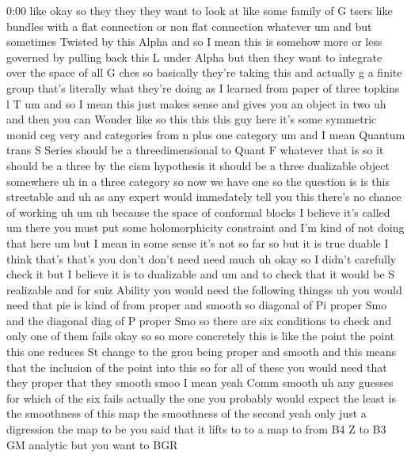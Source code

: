 \begin{unfinished}{0:00}
like  okay  so  they
they  they  want  to  look  at  like  some
family  of  G  tsers  like  bundles  with  a
flat  connection  or  non  flat  connection
whatever  um  and  but  sometimes  Twisted  by
this  Alpha  and  so  I  mean  this  is  somehow
more  or  less  governed  by  pulling  back
this  L  under
Alpha  but  then  they  want  to  integrate
over  the  space  of  all  G  ches  so
basically  they're  taking
this  and  actually  g  a  finite  group
that's  literally  what  they're  doing  as  I
learned  from  paper  of  three  topkins  l
T  um  and  so  I  mean  this  just  makes  sense
and  gives  you  an  object  in
two
uh  and  then  you  can
Wonder  like  so  this  this  this  guy  here
it's  some  symmetric
monid
ceg  very  and  categories  from  n  plus  one
category
um  and  I  mean  Quantum  trans  S  Series
should  be  a  threedimensional  to  Quant  F
whatever  that  is  so  it  should  be  a  three
by  the  cism  hypothesis  it  should  be  a
three  dualizable  object
somewhere  uh  in  a  three  category  so  now
we  have  one  so  the  question  is  is  this
streetable  and  uh  as  any  expert  would
immedately  tell  you  this  there's  no
chance  of  working
uh
um  uh
because  the  space  of  conformal  blocks  I
believe  it's  called  um  there  you  must
put  some  holomorphicity  constraint  and
I'm  kind  of  not  doing  that  here
um  but  I  mean  in  some  sense  it's  not  so
far  so
but  it  is  true
duable  I  think  that's
that's  you  don't  don't  need  need  much  uh
okay  so  I  didn't  carefully  check  it  but
I  believe  it  is  to  dualizable  and  um  and
to  check  that  it  would  be  S  realizable
and  for  suiz  Ability  you  would  need  the
following
thingss
uh  you  would  need
that  pie  is  kind  of
from  proper  and
smooth  so  diagonal  of
Pi  proper  Smo  and  the  diagonal  diag  of  P
proper  Smo  so  there  are  six  conditions
to  check  and  only  one  of  them  fails  okay
so  so  more  concretely  this  is  like  the
point  the
point  this  one
reduces  St  change  to  the  grou  being
proper  and  smooth  and  this  means  that
the  inclusion  of  the  point  into
this  so  for  all  of  these  you  would  need
that  they  proper  that  they  smooth  smoo  I
mean  yeah  Comm  smooth  uh  any  guesses  for
which  of  the  six
fails  actually  the  one  you  probably
would  expect  the  least  is  the  smoothness
of  this
map  the  smoothness  of  the  second  yeah
only
just  a  digression  the  map  to  be  you  said
that  it  lifts  to  to  a  map  to  from  B4  Z
to  B3  GM  analytic  but  you  want  to  BGR

\end{unfinished}

